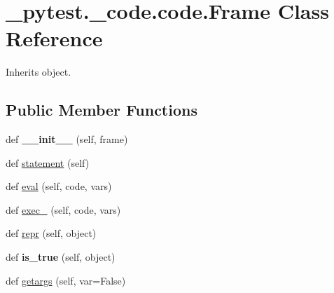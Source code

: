 \hypertarget{class__pytest_1_1__code_1_1code_1_1_frame}{}\section{\+\_\+pytest.\+\_\+code.\+code.\+Frame Class Reference}
\label{class__pytest_1_1__code_1_1code_1_1_frame}


Inherits object.

\subsection*{Public Member Functions}
\begin{DoxyCompactItemize}
\item 
\mbox{\label{class__pytest_1_1__code_1_1code_1_1_frame_aa2b641a20d0950ae8347ccc1f746a7c1}} 
def {\bfseries \+\_\+\+\_\+init\+\_\+\+\_\+} (self, frame)
\item 
def \hyperlink{class__pytest_1_1__code_1_1code_1_1_frame_ad23548ae1a23c439708b93a5042fefea}{statement} (self)
\item 
def \hyperlink{class__pytest_1_1__code_1_1code_1_1_frame_a2483073f398cacd7ec6b9c6b9b2fa506}{eval} (self, code, vars)
\item 
def \hyperlink{class__pytest_1_1__code_1_1code_1_1_frame_a6ef6fdc82162cc934af75969700dca82}{exec\+\_\+} (self, code, vars)
\item 
def \hyperlink{class__pytest_1_1__code_1_1code_1_1_frame_a6d1b4ebb61e4a1dd4ac54564f7c54011}{repr} (self, object)
\item 
\mbox{\label{class__pytest_1_1__code_1_1code_1_1_frame_a685c6e86c0bd38032551a132e321f9db}} 
def {\bfseries is\+\_\+true} (self, object)
\item 
def \hyperlink{class__pytest_1_1__code_1_1code_1_1_frame_a11a32c449e6caa70aecb0048d7af3ac2}{getargs} (self, var=False)
\end{DoxyCompactItemize}
